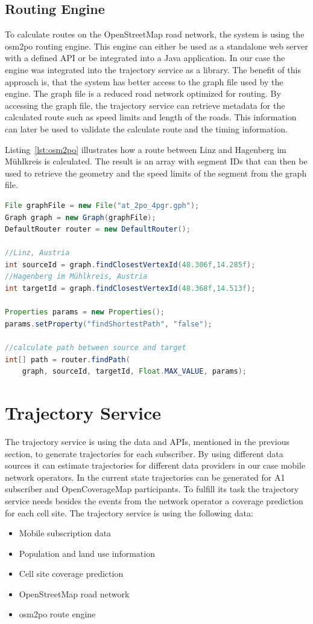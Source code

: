 \subsection{Routing Engine}
To calculate routes on the OpenStreetMap road network, the system is using the osm2po routing engine. This engine can either be used as a standalone web server with a defined API or be integrated into a Java application. In our case the engine was integrated into the trajectory service as a library. The benefit of this approach is, that the system has better access to the graph file used by the engine. The graph file is a reduced road network optimized for routing. By accessing the graph file, the trajectory service can retrieve metadata for the calculated route such as speed limits and length of the roads. This information can later be used to validate the calculate route and the timing information.

Listing~\ref{lst:osm2po} illustrates how a route between Linz and Hagenberg im Mühlkreis is calculated. The result is an array with segment IDs that can then be used to retrieve the geometry and the speed limits of the segment from the graph file.
\begin{lstlisting}[language=Java,style=JAVA,caption={Example code to calculate a route between two points},label={lst:osm2po}]
File graphFile = new File("at_2po_4pgr.gph");
Graph graph = new Graph(graphFile);
DefaultRouter router = new DefaultRouter();

//Linz, Austria
int sourceId = graph.findClosestVertexId(48.306f,14.285f);
//Hagenberg im Mühlkreis, Austria
int targetId = graph.findClosestVertexId(48.368f,14.513f);

Properties params = new Properties();
params.setProperty("findShortestPath", "false");

//calculate path between source and target
int[] path = router.findPath(
    graph, sourceId, targetId, Float.MAX_VALUE, params);
\end{lstlisting}
\section{Trajectory Service}
The trajectory service is using the data and APIs, mentioned in the previous section, to generate trajectories for each subscriber. By using different data sources it can estimate trajectories for different data providers in our case mobile network operators. In the current state trajectories can be generated for A1 subscriber and OpenCoverageMap participants. To fulfill its task the trajectory service needs besides the events from the network operator a coverage prediction for each cell site. The trajectory service is using the following data:
\begin{itemize}
\item Mobile subscription data
\item Population and land use information
\item Cell site coverage prediction
\item OpenStreetMap road network
\item osm2po route engine
\end{itemize}

